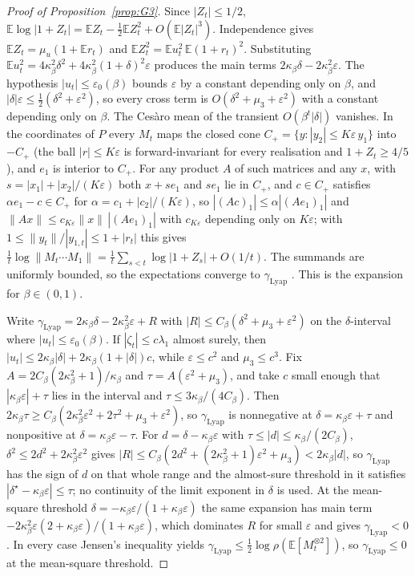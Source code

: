 \documentclass[11pt]{article}
\theoremstyle{remark}
\newcommand{\E}{\mathbb{E}}
\begin{document}
\begin{proof}[Proof of Proposition~\ref{prop:G3}]
Since $|Z_t|\le1/2$, $\E\log|1+Z_t|=\E Z_t-\frac12\E Z_t^2+O(\E|Z_t|^3)$. Independence gives $\E Z_t=\mu_u(1+\E r_t)$ and $\E Z_t^2=\E u_t^2\,\E(1+r_t)^2$. Substituting $\E u_t^2=4\kappa_\beta^2\delta^2+4\kappa_\beta^2(1+\delta)^2\varepsilon$ produces the main terms $2\kappa_\beta\delta-2\kappa_\beta^2\varepsilon$. The hypothesis $|u_t|\le\varepsilon_0(\beta)$ bounds $\varepsilon$ by a constant depending only on $\beta$, and $|\delta|\varepsilon\le\frac12(\delta^2+\varepsilon^2)$, so every cross term is $O(\delta^2+\mu_3+\varepsilon^2)$ with a constant depending only on $\beta$. The Ces\`aro mean of the transient $O(\beta^t|\delta|)$ vanishes. In the coordinates of $P$ every $M_t$ maps the closed cone $C_+=\{y:|y_2|\le K\varepsilon\,y_1\}$ into $-C_+$ (the ball $|r|\le K\varepsilon$ is forward-invariant for every realisation and $1+Z_t\ge4/5$), and $e_1$ is interior to $C_+$. For any product $A$ of such matrices and any $x$, with $s=|x_1|+|x_2|/(K\varepsilon)$ both $x+se_1$ and $se_1$ lie in $C_+$, and $c\in C_+$ satisfies $\alpha e_1-c\in C_+$ for $\alpha=c_1+|c_2|/(K\varepsilon)$, so $|(Ac)_1|\le\alpha|(Ae_1)_1|$ and $\|Ax\|\le c_{K\varepsilon}\|x\|\,|(Ae_1)_1|$ with $c_{K\varepsilon}$ depending only on $K\varepsilon$; with $1\le\|y_t\|/|y_{1,t}|\le1+|r_t|$ this gives $\frac1t\log\|M_t\cdots M_1\|=\frac1t\sum_{s<t}\log|1+Z_s|+O(1/t)$. The summands are uniformly bounded, so the expectations converge to $\gamma_{\mathrm{Lyap}}$ \citep{furstenberg1960products}. This is the expansion for $\beta\in(0,1)$.

Write $\gamma_{\mathrm{Lyap}}=2\kappa_\beta\delta-2\kappa_\beta^2\varepsilon+R$ with $|R|\le C_\beta(\delta^2+\mu_3+\varepsilon^2)$ on the $\delta$-interval where $|u_t|\le\varepsilon_0(\beta)$. If $|\zeta_t|\le c\lambda_1$ almost surely, then $|u_t|\le2\kappa_\beta|\delta|+2\kappa_\beta(1+|\delta|)c$, while $\varepsilon\le c^2$ and $\mu_3\le c^3$. Fix $A=2C_\beta(2\kappa_\beta^2+1)/\kappa_\beta$ and $\tau=A(\varepsilon^2+\mu_3)$, and take $c$ small enough that $|\kappa_\beta\varepsilon|+\tau$ lies in the interval and $\tau\le3\kappa_\beta/(4C_\beta)$. Then $2\kappa_\beta\tau\ge C_\beta(2\kappa_\beta^2\varepsilon^2+2\tau^2+\mu_3+\varepsilon^2)$, so $\gamma_{\mathrm{Lyap}}$ is nonnegative at $\delta=\kappa_\beta\varepsilon+\tau$ and nonpositive at $\delta=\kappa_\beta\varepsilon-\tau$. For $d=\delta-\kappa_\beta\varepsilon$ with $\tau\le|d|\le\kappa_\beta/(2C_\beta)$, $\delta^2\le2d^2+2\kappa_\beta^2\varepsilon^2$ gives $|R|\le C_\beta(2d^2+(2\kappa_\beta^2+1)\varepsilon^2+\mu_3)<2\kappa_\beta|d|$, so $\gamma_{\mathrm{Lyap}}$ has the sign of $d$ on that whole range and the almost-sure threshold in it satisfies $|\delta^\star-\kappa_\beta\varepsilon|\le\tau$; no continuity of the limit exponent in $\delta$ is used. At the mean-square threshold $\delta=-\kappa_\beta\varepsilon/(1+\kappa_\beta\varepsilon)$ the same expansion has main term $-2\kappa_\beta^2\varepsilon(2+\kappa_\beta\varepsilon)/(1+\kappa_\beta\varepsilon)$, which dominates $R$ for small $\varepsilon$ and gives $\gamma_{\mathrm{Lyap}}<0$. In every case Jensen's inequality yields $\gamma_{\mathrm{Lyap}}\le\frac12\log\rho(\E[M_t^{\otimes 2}])$, so $\gamma_{\mathrm{Lyap}}\le0$ at the mean-square threshold.


\end{proof}
\end{document}
